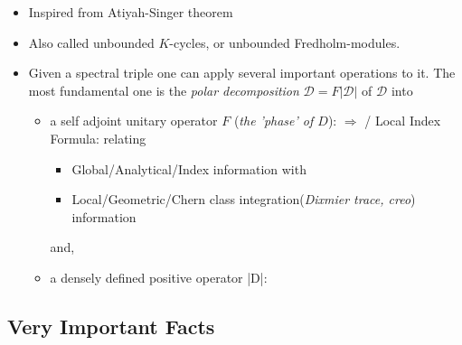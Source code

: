 \documentclass{article}
\begin{document}
\begin{itemize}
\begin{itemize}
\begin{itemize}
\begin{itemize}
                \end{itemize}
            
            \end{itemize}
            
        \end{itemize}
    
    \item Inspired from Atiyah-Singer theorem
    
    \item Also called unbounded $K$-cycles, or unbounded Fredholm-modules.
    
    \item Given a spectral triple one can apply several important operations to it. The most fundamental one is the \emph{polar decomposition} $\mathcal D = F|\mathcal D|$ of $\mathcal D$ into 
    
        \begin{itemize}
            
        \item a self adjoint unitary operator $F$ (\emph{the 'phase' of $D$}):  $\Longrightarrow$ / Local Index Formula: relating
        
            \begin{itemize}
                
                \item Global/Analytical/Index information with
                
                \item Local/Geometric/Chern class integration(\emph{Dixmier trace, creo}) information
                
            \end{itemize}   
        and,
        
        \item a densely defined positive operator |D|: 
            
        \end{itemize} 
    
    \end{itemize}

\subsection{Very Important Facts}
\end{document}
